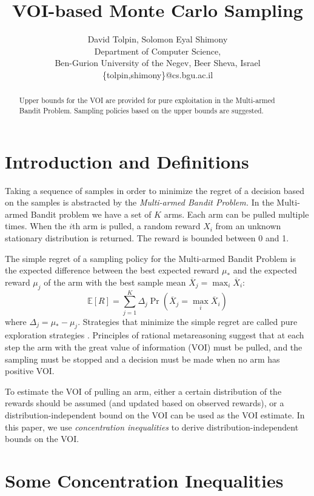 \documentclass{article}
\title{VOI-based Monte Carlo Sampling}
\author {David Tolpin, Solomon Eyal Shimony \\
Department of Computer Science, \\
Ben-Gurion University of the Negev, Beer Sheva, Israel \\
\{tolpin,shimony\}@cs.bgu.ac.il}
\newcommand {\IE} {\ensuremath {\mathbb{E}}}
\begin{document}
\maketitle

\begin{abstract}
Upper bounds for the VOI are provided for pure exploitation in the
Multi-armed Bandit Problem. Sampling policies based on the upper
bounds are suggested.
\end{abstract}

\section{Introduction and Definitions}

Taking a sequence of samples in order to minimize the
regret of a decision based on the samples is abstracted by the
{\em Multi-armed Bandit Problem.} In the Multi-armed Bandit problem
we have a set of $K$ arms. Each arm can be pulled multiple
times. When the $i$th arm is pulled, a random reward $X_i$ from an
unknown stationary distribution is returned.  The reward is bounded
between 0 and 1.

The simple regret of a sampling policy for the Multi-armed Bandit
Problem is the expected difference between the best expected reward
$\mu_*$ and the expected reward $\mu_j$ of the arm with the best sample mean
$\overline X_j=\max_i\overline X_i$:
\begin{equation}
\label{eq:simple-regret}
\IE[R]=\sum_{j=1}^K\Delta_j\Pr(\overline X_j=\max_i\overline X_i)
\end{equation}
where $\Delta_j=\mu_*-\mu_j$.
Strategies that minimize the simple regret are called pure exploration
strategies \cite{Bubeck.pure}. Principles of rational metareasoning
\cite{Russel.right} suggest that at each step the arm with the great
value of information (VOI) must be pulled, and the sampling must be
stopped and a decision must be made when no arm has positive VOI. 

To estimate the VOI of pulling an arm, either a certain 
distribution of the rewards should be assumed (and updated based on
observed rewards), or a distribution-independent bound on the VOI can be
used as the VOI estimate. In this paper, we use {\em concentration inequalities}
to derive distribution-independent bounds on the VOI.

\section{Some Concentration Inequalities}
\end{document}
